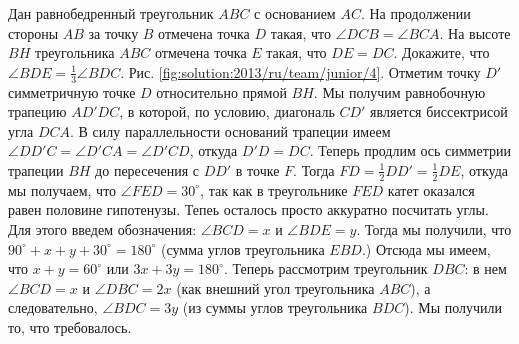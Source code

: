 \problem{}
Дан равнобедренный треугольник $ABC$ с основанием $AC$.
На продолжении стороны $AB$ за точку $B$ отмечена точка $D$ такая, что
$\angle DCB = \angle BCA$.
На высоте $BH$ треугольника $ABC$ отмечена точка $E$ такая, что $DE = DC$.
Докажите, что $\angle BDE = \frac{1}{3} \angle BDC$. 
%
\label{solution:2013/ru/team/junior/4}
Рис. \ref{fig:solution:2013/ru/team/junior/4}.
Отметим точку $D'$ симметричную точке $D$ относительно прямой $BH$.
Мы получим равнобочную трапецию $AD'DC$, в которой, по условию, диагональ $CD'$
является биссектрисой угла $DCA$.
В силу параллельности оснований трапеции имеем
$\angle D D' C = \angle D' C A = \angle D' C D$, откуда $D'D = DC$.
Теперь продлим ось симметрии трапеции $BH$ до пересечения с $DD'$ в точке $F$.
Тогда $FD = \frac{1}{2} DD' = \frac{1}{2} DE$, откуда мы получаем, что
$\angle FED = 30^\circ$, так как в треугольнике $FED$ катет оказался равен
половине гипотенузы.
Тепеь осталось просто аккуратно посчитать углы.
Для этого введем обозначения: $\angle BCD = x$ и $\angle BDE = y$.
Тогда мы получили, что $90^\circ + x + y + 30^\circ = 180^\circ$
(сумма углов треугольника $EBD$.)
Отсюда мы имеем, что $x + y = 60^\circ$ или $3 x + 3 y = 180^\circ$.
Теперь рассмотрим треугольник $DBC$: в нем $\angle BCD = x$ и
$\angle DBC = 2 x$ (как внешний угол треугольника $ABC$), а следовательно,
$\angle BDC = 3 y$ (из суммы углов треугольника $BDC$).
Мы получили то, что требовалось.
\endproblem
